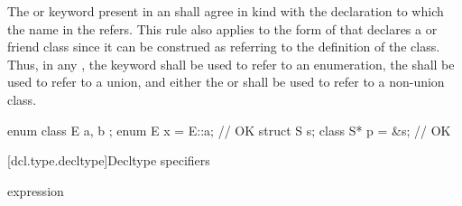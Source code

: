 \pnum
The  or  keyword
present in an
 shall agree in kind with the
declaration to which the name in the
 refers. This rule also applies to
the form of  that declares a
 or friend class since it can be construed
as referring to the definition of the class. Thus, in any
, the  keyword
shall be
used to refer to an enumeration, the 
 shall be used to refer to a union,
and either the  or 
 shall be used to refer to a non-union class.
\begin{example}
\begin{codeblock}
enum class E { a, b };
enum E x = E::a;                // OK
struct S { } s;
class S* p = &s;                // OK
\end{codeblock}
\end{example}

[dcl.type.decltype]{Decltype specifiers}%
%

\begin{bnf}
\br
   \terminal{(} expression \terminal{)}
\end{bnf}

